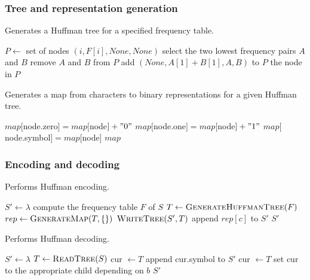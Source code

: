 \documentclass[a4paper]{article}
\DeclarePairedDelimiter{\br}{\{}{\}}
\begin{document}
\begin{multicols}{2}
\subsubsection{Tree and representation generation}
\begin{algorithm}[H]
\caption{Generates a Huffman tree for a specified frequency table.}
\begin{algorithmic}[1]
\State $P \gets $ set of nodes $(i, F[i], None, None)$
\State select the two lowest frequency pairs $A$ and $B$
\State remove $A$ and $B$ from $P$
\State add $(None, A[1]+B[1], A, B)$ to $P$
\EndWhile
\State \Return the node in $P$
\EndFunction
\end{algorithmic}
\end{algorithm}
\begin{algorithm}[H]
\caption{Generates a map from characters to binary representations for a given Huffman tree.}
\begin{algorithmic}[1]
\State $map[$node.zero$] = map[$node$] + "0"$
\State $map[$node.one$] = map[$node$]+"1"$
\State {}
\State {}
\Else
\State $map[$node.symbol$] = map[$node$]$
\EndIf
\State \Return $map$
\EndFunction
\end{algorithmic}
\end{algorithm}
\vspace*{-.4cm}
\subsubsection{Encoding and decoding}
\vspace*{-.4cm}
\begin{algorithm}[H]
\caption{Performs Huffman encoding.}
\begin{algorithmic}[1]
\State $S' \gets \lambda$
\State compute the frequency table $F$ of $S$
\State $T \gets \Call{GenerateHuffmanTree}{F}$
\State $rep \gets \Call{GenerateMap}{T, \br{}}$
\State $\Call{WriteTree}{S', T}$
\State append $rep[c]$ to $S'$
\EndFor
\State \Return $S'$
\EndFunction
\end{algorithmic}
\end{algorithm}
\vspace*{-.8cm}
\begin{algorithm}[H]
\caption{Performs Huffman decoding.}
\begin{algorithmic}[1]
\State $S' \gets \lambda$
\State $T \gets \Call{ReadTree}{S}$
\State cur $\gets T$
\State append cur.symbol to $S'$
\State cur $\gets T$
\EndIf
\State set cur to the appropriate child depending on $b$
\EndFor
\State \Return $S'$
\EndFunction
\end{algorithmic}
\end{algorithm}

\end{multicols}
\end{document}
